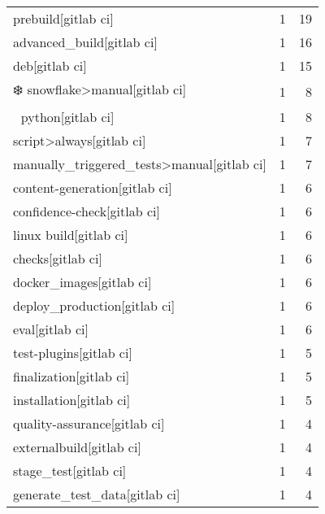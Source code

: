 \begin{tabular}{lrr}
prebuild[gitlab ci]                        &                   1 &            19 \\
advanced\_build[gitlab ci]                  &                   1 &            16 \\
deb[gitlab ci]                             &                   1 &            15 \\
❄️ snowflake>manual[gitlab ci]             &                   1 &             8 \\
🐍 python[gitlab ci]                        &                   1 &             8 \\
script>always[gitlab ci]                   &                   1 &             7 \\
manually\_triggered\_tests>manual[gitlab ci] &                   1 &             7 \\
content-generation[gitlab ci]              &                   1 &             6 \\
confidence-check[gitlab ci]                &                   1 &             6 \\
linux build[gitlab ci]                     &                   1 &             6 \\
checks[gitlab ci]                          &                   1 &             6 \\
docker\_images[gitlab ci]                   &                   1 &             6 \\
deploy\_production[gitlab ci]               &                   1 &             6 \\
eval[gitlab ci]                            &                   1 &             6 \\
test-plugins[gitlab ci]                    &                   1 &             5 \\
finalization[gitlab ci]                    &                   1 &             5 \\
installation[gitlab ci]                    &                   1 &             5 \\
quality-assurance[gitlab ci]               &                   1 &             4 \\
externalbuild[gitlab ci]                   &                   1 &             4 \\
stage\_test[gitlab ci]                      &                   1 &             4 \\
generate\_test\_data[gitlab ci]              &                   1 &             4 \\

\end{tabular}
